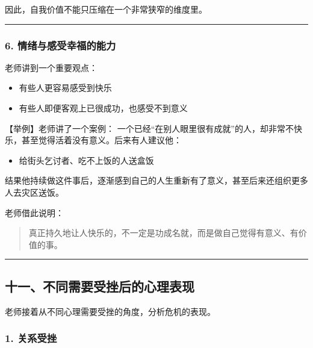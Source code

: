 \documentclass[
  chinese,
  9pt,
  a4paper,
]{ctexart}
\providecommand{\tightlist}{%
  \setlength{\itemsep}{0pt}\setlength{\parskip}{0pt}}
\begin{document}
因此，自我价值不能只压缩在一个非常狭窄的维度里。

\begin{center}\rule{0.5\linewidth}{0.5pt}\end{center}

\subsubsection{6.
情绪与感受幸福的能力}\label{ux60c5ux7eeaux4e0eux611fux53d7ux5e78ux798fux7684ux80fdux529b}

老师讲到一个重要观点：

\begin{itemize}
\tightlist
\item
  有些人更容易感受到快乐
\item
  有些人即便客观上已很成功，也感受不到意义
\end{itemize}

【举例】老师讲了一个案例：
一个已经``在别人眼里很有成就''的人，却非常不快乐，甚至觉得活着没有意义。后来有人建议他：

\begin{itemize}
\tightlist
\item
  给街头乞讨者、吃不上饭的人送盒饭
\end{itemize}

结果他持续做这件事后，逐渐感到自己的人生重新有了意义，甚至后来还组织更多人去灾区送饭。

老师借此说明：

\begin{quote}
真正持久地让人快乐的，不一定是功成名就，而是做自己觉得有意义、有价值的事。
\end{quote}

\begin{center}\rule{0.5\linewidth}{0.5pt}\end{center}

\subsection{十一、不同需要受挫后的心理表现}\label{ux5341ux4e00ux4e0dux540cux9700ux8981ux53d7ux632bux540eux7684ux5fc3ux7406ux8868ux73b0}

老师接着从不同心理需要受挫的角度，分析危机的表现。

\subsubsection{1. 关系受挫}\label{ux5173ux7cfbux53d7ux632b}
\end{document}
